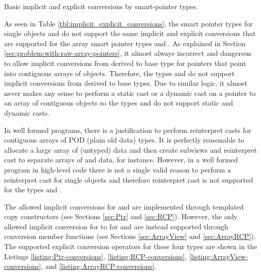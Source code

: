 \documentclass[pdf,ps2pdf,11pt]{SANDreport}
\begin{document}
\begin{table}
\begin{center}

\end{center}
\caption{\label{tbl:implicit_explicit_conversions}
Basic implicit and explicit conversions by smart-pointer types.}
\end{table}


As seen in Table {}\ref{tbl:implicit_explicit_conversions}, the smart
pointer types for single objects {} and {} do not
support the same implicit and explicit conversions that are supported
for the array smart pointer types {} and
{}.  As explained in Section
{}\ref{sec:problem-with-raw-array-pointers}, it almost always
incorrect and dangerous to allow implicit conversions from derived to
base type for pointers that point into contiguous arrays of objects.
Therefore, the types {} and {} do not
support implicit conversions from derived to base types.  Due to
similar logic, it almost never makes any sense to perform a static
cast or a dynamic cast on a pointer to an array of contiguous objects
so the types {} and {} do not support
static and dynamic casts.

In well formed programs, there is a justification to perform
reinterpret casts for contiguous arrays of POD (plain old data)
types. It is perfectly reasonable to allocate a large array of
{} (untyped) data and then create subviews and reinterpret
cast to separate arrays of {} and {} data, for
instance.  However, in a well formed program in high-level code there
is not a single valid reason to perform a reinterpret cast for single
objects and therefore reinterpret cast is not supported for the types
{} and {}.

The allowed implicit conversions for {} and {} are
implemented through templated copy constructors (see Sections
{}\ref{sec:Ptr} and {}\ref{sec:RCP}).  However, the only allowed
implicit conversion for {} to {} for
{} and {} are instead supported through
conversion member functions (see Sections {}\ref{sec:ArrayView} and
{}\ref{sec:ArrayRCP}).  The supported explicit conversion operators
for these four types are shown in the Listings
{}\ref{listing:Ptr-conversions}, {}\ref{listing:RCP-conversions},
{}\ref{listing:ArrayView-conversions}, and
{}\ref{listing:ArrayRCP-conversions}.
\end{document}
